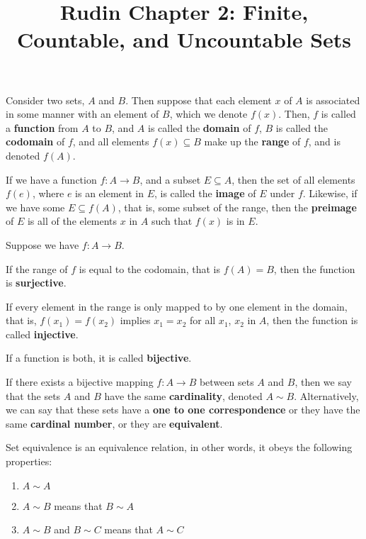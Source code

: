 \documentclass{article}
\title{Rudin Chapter 2: Finite, Countable, and Uncountable Sets}
\begin{document}
\maketitle

\begin{definition}[Function]
	Consider two sets, $A$ and $B$. Then suppose that each element $x$ of $A$ is associated in some manner with an element of $B$, which we denote $f(x)$. Then, $f$ is called a \textbf{function} from $A$ to $B$, and $A$ is called the \textbf{domain} of $f$, $B$ is called the \textbf{codomain} of $f$, and all elements $f(x) \subseteq B$ make up the \textbf{range} of $f$, and is denoted $f(A)$.
\end{definition}

\begin{definition}[Image]
If we have a function $f: A \to B$, and a subset $E \subseteq A$, then the set of all elements $f(e)$, where $e$ is an element in $E$, is called the \textbf{image}	of $E$ under $f$. Likewise, if we have some $E \subseteq f(A)$, that is, some subset of the range, then the \textbf{preimage} of $E$ is all of the elements $x$ in $A$ such that $f(x)$ is in $E$.
\end{definition}

\begin{definition}
	
Suppose we have $f: A\to B$. 

If the range of $f$ is equal to the codomain, that is $f(A) = B$, then the function is \textbf{surjective}.

If every element in the range is only mapped to by one element in the domain, that is, $f(x_1) = f(x_2)$ implies $x_1 = x_2$ for all $x_1$, $x_2$ in $A$, then the function is called \textbf{injective}.

If a function is both, it is called \textbf{bijective}.
\end{definition}

\begin{definition}
	
If there exists a bijective mapping $f: A\to B$ between sets $A$ and $B$, then we say that the sets $A$ and $B$ have the same \textbf{cardinality}, denoted $A \sim B$. Alternatively, we can say that these sets have a \textbf{one to one correspondence} or they have the same \textbf{cardinal number}, or they are \textbf{equivalent}.
\end{definition}

\begin{proposition}

Set equivalence is an equivalence relation, in other words, it obeys the following properties: \begin{enumerate}
	\item $A \sim A$
	\item $A \sim B$ means that $B \sim A$
	\item $A \sim B$ and $B \sim C$ means that $A \sim C$
\end{enumerate}
	\end{proposition}
\end{document}
